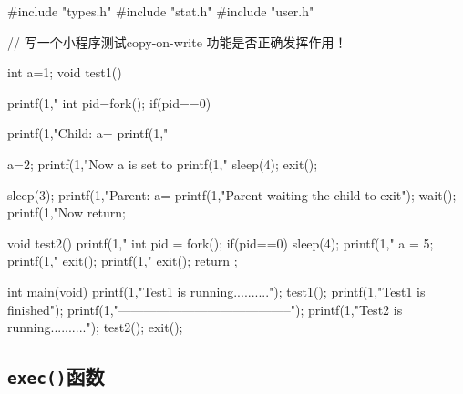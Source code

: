 \documentclass{swfcthesismscctex}
\begin{document}
\begin{ccode}
#include "types.h"
#include "stat.h"
#include "user.h"

// 写一个小程序测试copy-on-write 功能是否正确发挥作用！

int a=1;
void test1()
{
  printf(1,"%
  int pid=fork();
  if(pid==0)
  {
    printf(1,"Child: a=%
    printf(1,"%

    a=2;
    printf(1,"Now a is set to %
    printf(1,"%
    sleep(4);
    exit();
  }
  sleep(3);
  printf(1,"Parent: a=%
  printf(1,"Parent waiting the child to exit\n");
  wait();
  printf(1,"Now %
  return;
}

void test2()
{
    printf(1,"%
    int pid = fork();
    if(pid==0)
    {
        sleep(4);
        printf(1,"%
        a = 5;
        printf(1,"%
        exit();
    }
    printf(1,"%
    exit();
    return ;
}


int main(void)
{
  printf(1,"Test1 is running..........\n");
  test1();
  printf(1,"Test1 is finished\n");
  printf(1,"-----------------------------------------\n");
  printf(1,"Test2 is running..........\n");
  test2();
  exit();
}
\end{ccode}

\subsection{\texttt{exec()}函数}
\label{sec:exec}
\end{document}

